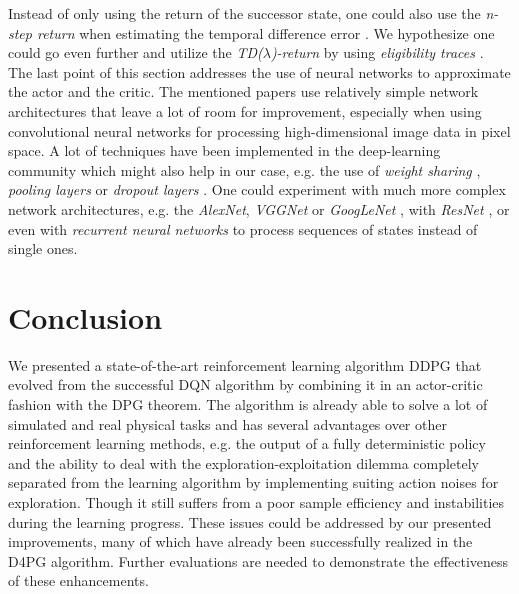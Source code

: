 Instead of only using the return of the successor state, one could also use the \textit{n-step return} when estimating the temporal difference error \citep{barth2018distributed}. We hypothesize one could go even further and utilize the \textit{TD($\lambda$)-return} by using \textit{eligibility traces} \citep{tesauro1995temporal}.\\
The last point of this section addresses the use of neural networks to approximate the actor and the critic. The mentioned papers use relatively simple network architectures that leave a lot of room for improvement, especially when using convolutional neural networks for processing high-dimensional image data in pixel space. A lot of techniques have been implemented in the deep-learning community which might also help in our case, e.g. the use of \textit{weight sharing} \citep{nowlan1992simplifying}, \textit{pooling layers} \citep{zeiler2013stochastic} or \textit{dropout layers} \citep{srivastava2014dropout}. One could experiment with much more complex network architectures, e.g. the \textit{AlexNet}, \textit{VGGNet} or \textit{GoogLeNet} \citep{szegedy2015going}, with \textit{ResNet} \citep{he2016deep}, or even with \textit{recurrent neural networks} \citep{haykin1994neural} to process sequences of states instead of single ones. 


\section{Conclusion}
\label{sec:conclusion}
We presented a state-of-the-art reinforcement learning algorithm DDPG that evolved from the successful DQN algorithm by combining it in an actor-critic fashion with the DPG theorem. The algorithm is already able to solve a lot of simulated and real physical tasks and has several advantages over other reinforcement learning methods, e.g. the output of a fully deterministic policy and the ability to deal with the exploration-exploitation dilemma completely separated from the learning algorithm by implementing suiting action noises for exploration. Though it still suffers from a poor sample efficiency and instabilities during the learning progress. These issues could be addressed by our presented improvements, many of which have already been successfully realized in the D4PG algorithm. Further evaluations are needed to demonstrate the effectiveness of these enhancements.

\newpage



